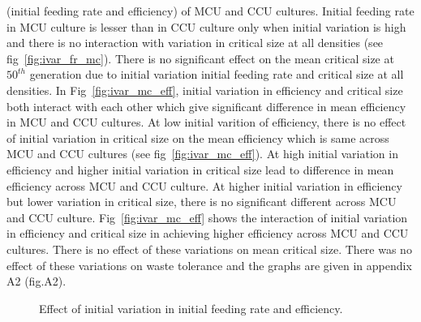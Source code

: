 (initial feeding rate and efficiency) of MCU and CCU cultures. Initial feeding rate in MCU culture is lesser than in CCU culture only when initial variation is high and there is no interaction with variation in critical size at all densities (see fig~\ref{fig:ivar_fr_mc}). There is no significant effect on the mean critical size at $50^{th}$ generation due to initial variation initial feeding rate and critical size at all densities. In Fig~\ref{fig:ivar_mc_eff}, initial variation in efficiency and critical size both interact with each other which give significant difference in mean efficiency in MCU and CCU cultures. At low initial varition of efficiency, there is no effect of initial variation in critical size on the mean efficiency which is same across MCU and CCU cultures (see fig~\ref{fig:ivar_mc_eff}). At high initial variation in efficiency and higher initial variation in critical size lead to difference in mean efficiency across MCU and CCU culture. At higher initial variation in efficiency but lower variation in critical size, there is no significant different across MCU and CCU culture. Fig~\ref{fig:ivar_mc_eff} shows the interaction of initial variation in efficiency and critical size in achieving higher efficiency across MCU and CCU cultures. There is no effect of these variations on mean critical size. There was no effect of these variations on waste tolerance and the graphs are given in appendix A2 (fig.A2).
\begin{figure}[p]
  \caption{Effect of initial variation in initial feeding rate and efficiency.}
  \label{fig:ivar_fr_eff}
\end{figure}
